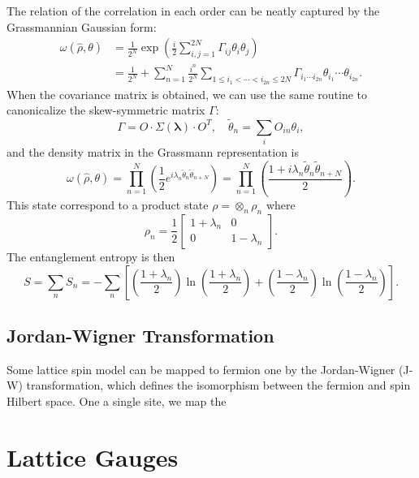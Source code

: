 The relation of the correlation in each order can be neatly captured by the Grassmannian Gaussian form:
\begin{equation}
\begin{aligned}
	\omega(\hat \rho, \theta) 
	&= \frac{1}{2^N} \exp \left(\frac{i}{2} \sum_{i,j=1}^{2N}\Gamma_{ij}\theta_i \theta_j \right) \\
	&=\frac{1}{2^N} + \sum_{n=1}^{N}\frac{i^n}{2^N}\sum_{1\le i_{1}<\cdots<i_{2n} \le 2N}\Gamma_{i_{1}\cdots i_{2n}} \theta_{i_1} \cdots \theta_{i_{2n}}.
\end{aligned}
\end{equation}
When the covariance matrix is obtained, we can use the same routine to canonicalize the skew-symmetric matrix $\Gamma$:
\begin{equation*}
	\Gamma = O \cdot \Sigma(\bm \lambda) \cdot O^T, \quad
	\tilde\theta_n = \sum_i O_{in} \theta_i,
\end{equation*}
and the density matrix in the Grassmann representation is
\begin{equation}
	\omega(\hat \rho, \theta) 
	= \prod_{n=1}^N \left(\frac{1}{2} e^{i \lambda_n \tilde\theta_n \tilde\theta_{n+N}} \right)
	= \prod_{n=1}^N \left(\frac{1+i\lambda_n \tilde\theta_n\tilde\theta_{n+N}}{2}  \right).
\end{equation}
This state correspond to a product state $\rho = \otimes_n \rho_n$ where
\begin{equation}
	\rho_n = \frac{1}{2} \left[\begin{array}{cc}
		1 + \lambda_n & 0 \\
		0 & 1 - \lambda_n
	\end{array} \right].
\end{equation}
The entanglement entropy is then
\begin{equation}
	S=\sum_n S_n = -\sum_n \left[
	\left(\frac{1+\lambda_n}{2}\right)\ln\left(\frac{1+\lambda_n}{2}\right)
	+ \left(\frac{1-\lambda_n}{2}\right)\ln\left(\frac{1-\lambda_n}{2}\right)\right].
\end{equation}


\subsection{Jordan-Wigner Transformation}
Some lattice spin model can be mapped to fermion one by the Jordan-Wigner (J-W) transformation, which defines the isomorphism between the fermion and spin Hilbert space.
One a single site, we map the 




\section{Lattice Gauges}



